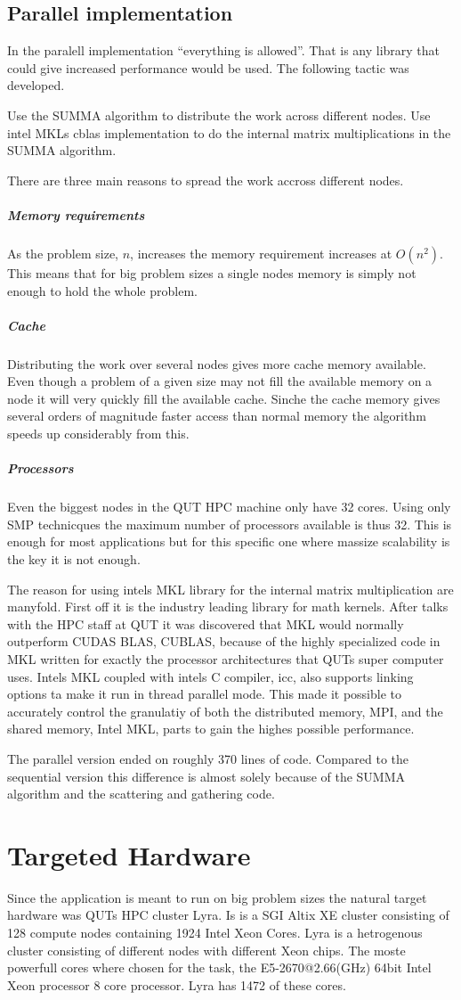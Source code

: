 \documentclass{article}
\begin{document}
\subsection{Parallel implementation}
In the paralell implementation ``everything is allowed''. That is any library that could give
increased performance would be used. The following tactic was developed.

Use the SUMMA algorithm to distribute the work across different nodes. Use intel MKLs cblas implementation
to do the internal matrix multiplications in the SUMMA algorithm.

There are three main reasons to spread the work accross different nodes.
\subparagraph{Memory requirements}
As the problem size, $n$, increases the memory requirement increases at $O(n^2)$. This means that for
big problem sizes a single nodes memory is simply not enough to hold the whole problem.
\subparagraph{Cache}
Distributing the work over several nodes gives more cache memory available. Even though a problem
of a given size may not fill the available memory on a node it will very quickly fill the available
cache. Sinche the cache memory gives several orders of magnitude faster access than normal memory
the algorithm speeds up considerably from this.
\subparagraph{Processors}
Even the biggest nodes in the QUT HPC machine only have 32 cores. Using only SMP technicques
the maximum number of processors available is thus 32. This is enough for most applications but
for this specific one where massize scalability is the key it is not enough.

The reason for using intels MKL library for the internal matrix multiplication are manyfold. First
off it is the industry leading library for math kernels. After talks with the HPC staff at QUT it was
discovered that MKL would normally outperform CUDAS BLAS, CUBLAS, because of the highly specialized code
in MKL written for exactly the processor architectures that QUTs super computer uses. Intels MKL coupled
with intels C compiler, icc, also supports linking options ta make it run in thread parallel mode. This
made it possible to accurately control the granulatiy of both the distributed memory, MPI, and the
shared memory, Intel MKL, parts to gain the highes possible performance.

The parallel version ended on roughly 370 lines of code. Compared to the sequential version this difference
is almost solely because of the SUMMA algorithm and the scattering and gathering code.

\section{Targeted Hardware}
Since the application is meant to run on big problem sizes the natural target hardware was QUTs
HPC cluster Lyra. Is is a SGI Altix XE cluster consisting of 128 compute nodes containing 1924 Intel Xeon Cores. Lyra is a
hetrogenous cluster consisting of different nodes with different Xeon chips.
The moste powerfull cores where chosen for the task, the E5-2670@2.66(GHz) 64bit Intel Xeon processor 8 core processor.
Lyra has 1472 of these cores.
\end{document}
